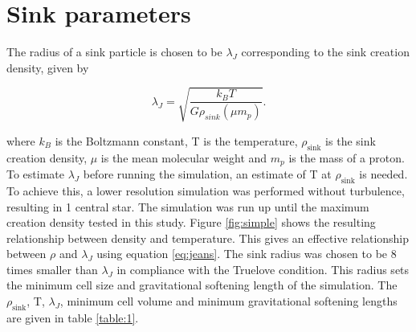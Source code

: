 \documentclass[fleqn,usenatbib]{mnras}
\begin{document}
\section{Sink parameters}

The radius of a sink particle is chosen to be $\lambda_J$ corresponding to the sink creation density, given by


\begin{equation}
    \lambda_J=\sqrt{  \frac{k_B T} {G \rho_{sink} (\mu m_p)}}.
	\label{eq:jeans}
\end{equation}

where $k_B$ is the Boltzmann constant, T is the temperature, $\rho_{\text{sink}}$ is the sink creation density, $\mu$ is the mean molecular weight and $m_p$ is the mass of a proton. To estimate $\lambda_J$ before running the simulation, an estimate of T at $\rho_{\text{sink}}$ is needed. To achieve this, a lower resolution simulation was performed without turbulence, resulting in 1 central star. The simulation was run up until the maximum creation density tested in this study. Figure \ref{fig:simple} shows the resulting relationship between density and temperature. This gives an effective relationship between $\rho$ and $\lambda_J$ using equation \ref{eq:jeans}. The sink radius was chosen to be 8 times smaller than $\lambda_J$ in compliance with the Truelove condition. This radius sets the minimum cell size and gravitational softening length of the simulation. The $\rho_{\text{sink}}$, T, $\lambda_J$, minimum cell volume and minimum gravitational softening lengths are given in table \ref{table:1}.
\end{document}
